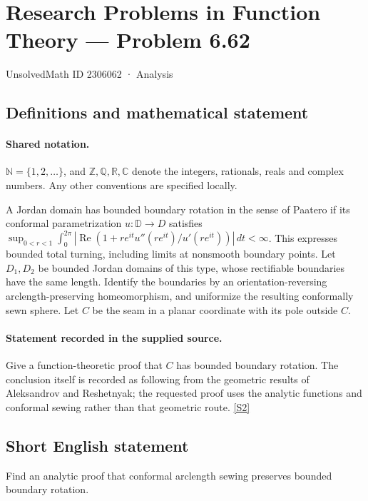\documentclass[11pt]{article}
\newcommand{\sref}[2]{\hyperlink{source:#1:#2}{[S#2]}}
\begin{document}
\setcounter{section}{2306061}
\section{Research Problems in Function Theory — Problem 6.62}\label{2306062}
{\small\sffamily UnsolvedMath ID 2306062 · Analysis}
\subsection{Definitions and mathematical statement}

\paragraph{Shared notation.}$\mathbb N=\{1,2,\ldots\}$, and $\mathbb Z,\mathbb Q,\mathbb R,\mathbb C$ denote the integers, rationals, reals and complex numbers. Any other conventions are specified locally.


A Jordan domain has bounded boundary rotation in the sense of Paatero if its conformal parametrization $u:\mathbb D\to D$ satisfies $\sup_{0<r<1}\int_0^{2\pi}|\operatorname{Re}(1+re^{it}u''(re^{it})/u'(re^{it}))|\,dt<\infty$. This expresses bounded total turning, including limits at nonsmooth boundary points. Let $D_1,D_2$ be bounded Jordan domains of this type, whose rectifiable boundaries have the same length. Identify the boundaries by an orientation-reversing arclength-preserving homeomorphism, and uniformize the resulting conformally sewn sphere. Let $C$ be the seam in a planar coordinate with its pole outside $C$.
\paragraph{Statement recorded in the supplied source.}
Give a function-theoretic proof that $C$ has bounded boundary rotation. The conclusion itself is recorded as following from the geometric results of Aleksandrov and Reshetnyak; the requested proof uses the analytic functions and conformal sewing rather than that geometric route. \sref{2306062}{2}
\subsection{Short English statement}
Find an analytic proof that conformal arclength sewing preserves bounded boundary rotation.
\end{document}
